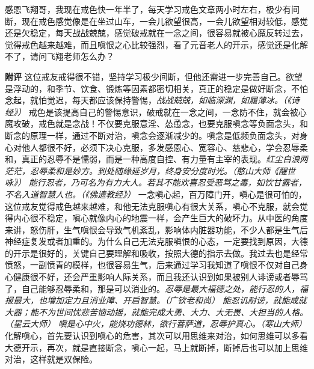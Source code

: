 \begin{case}
    感恩飞翔哥，我现在戒色快一年半了，每天学习戒色文章两小时左右，极少有间断，现在戒色感觉像是在坐过山车，一会儿欲望很高，一会儿欲望相对较低，感觉还是欠稳定，每天战战兢兢，感觉破戒就在一念之间，很容易就被心魔反转过去，觉得戒色越来越难，而且嗔恨之心比较强烈，看了元音老人的开示，感觉还是化解不了，请问飞翔老师怎么办？

    \textbf{附评} 这位戒友戒得很不错，坚持学习极少间断，但他还需进一步完善自己。欲望是浮动的，和季节、饮食、锻炼等因素都密切相关，真正的稳定是做好断念，不怕念起，就怕觉迟，每天都应该保持警惕，\textit{战战兢兢，如临深渊，如履薄冰。（《诗经》）} 戒色是该提高自己的警惕意识，破戒就在一念之间，一念防不住，就会被心魔攻破，戒色就是念战！不仅要克服意淫、怂恿念，也要克服嗔念等负面念头，和断念的原理一样，通过不断对治，嗔念会逐渐减少的。嗔念是低频负面念头，对身心对他人都很不好，必须下决心克服，多发感恩心、宽容心、慈悲心，学会忍辱柔和，真正的忍辱不是懦弱，而是一种高度自控、有力量有主宰的表现。\textit{红尘白浪两茫茫，忍辱柔和是妙方。到处随缘延岁月，终身安分度时光。（憨山大师《醒世咏》）} \textit{能行忍者，乃可名为有力大人。若其不能欢喜忍受恶骂之毒，如饮甘露者，不名入道智慧人也。（《佛遗教经》）} 一念嗔心起，百万障门开，嗔心是很可怕的，这位戒友觉得戒色越来越难，和他无法克服嗔心有很大关系，嗔心不克服，就会觉得内心很不稳定，嗔心就像内心的地震一样，会产生巨大的破坏力。从中医的角度来讲，怒伤肝，生气嗔恨会导致气机紊乱，影响体内脏器功能，不少人都是生气后神经症复发或者加重的。为什么自己无法克服嗔恨的心态，一定要找到原因，大德的开示是很好的，关键自己要理解和吸收，按照大德的指示去做。我过去也是经常愤怒，一副愤青的模样，也很容易生气，后来通过学习我知道了嗔恨不仅对自己身心健康很不好，还会严重影响人际关系，而且我还认识到如果被别人诽谤或者辱骂了，自己能够忍辱柔和，那是可以消业的。\textit{忍辱是最大福德之处，能行忍的人，福报最大，也增加定力且消业障、开启智慧。（广钦老和尚）} \textit{能忍讥耐谤，就能成就大器；能不为世间忧悲苦恼动摇，就能完成大勇、大力、大无畏、大担当的人格。（星云大师）} \textit{嗔是心中火，能烧功德林，欲行菩萨道，忍辱护真心。（寒山大师）} 化解嗔心，首先要认识到嗔心的危害，其次可以用思维来对治，如何思维可以多看大德开示，再次，就是直接断念，嗔心一起，马上就断掉，断掉后也可以加上思维对治，这样就是双保险。
\end{case}

